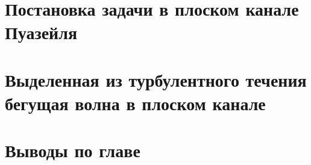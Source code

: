 \section{Постановка задачи в плоском канале Пуазейля}



\section{Выделенная из турбулентного течения бегущая волна в плоском канале}



\section{Выводы по главе}


